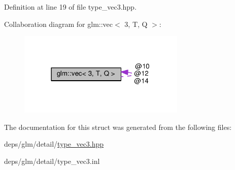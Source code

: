 Definition at line 19 of file type\+\_\+vec3.\+hpp.



Collaboration diagram for glm\+:\+:vec$<$ 3, T, Q $>$\+:
\nopagebreak
\begin{figure}[H]
\begin{center}
\leavevmode
\includegraphics[width=226pt]{dd/dcf/structglm_1_1vec_3_013_00_01T_00_01Q_01_4__coll__graph}
\end{center}
\end{figure}


The documentation for this struct was generated from the following files\+:\begin{DoxyCompactItemize}
\item 
deps/glm/detail/\hyperlink{type__vec3_8hpp}{type\+\_\+vec3.\+hpp}\item 
deps/glm/detail/type\+\_\+vec3.\+inl\end{DoxyCompactItemize}
